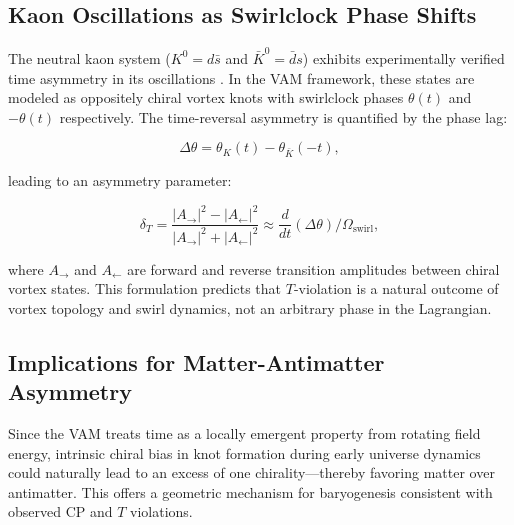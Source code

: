 \subsection{Kaon Oscillations as Swirlclock Phase Shifts}

The neutral kaon system ($K^0 = d\bar{s}$ and $\bar{K}^0 = \bar{d}s$) exhibits experimentally verified time asymmetry in its oscillations \cite{christenson1964evidence, cplear1998tviolation}. In the VAM framework, these states are modeled as oppositely chiral vortex knots with swirlclock phases $\theta(t)$ and $-\theta(t)$ respectively. The time-reversal asymmetry is quantified by the phase lag:

\begin{equation}
\Delta \theta = \theta_K(t) - \theta_{\bar{K}}(-t),
\end{equation}

leading to an asymmetry parameter:

\begin{equation}
\delta_T = \frac{|A_{\rightarrow}|^2 - |A_{\leftarrow}|^2}{|A_{\rightarrow}|^2 + |A_{\leftarrow}|^2} \approx \frac{d}{dt} (\Delta \theta) \Big/ \Omega_{\text{swirl}},
\end{equation}

where $A_{\rightarrow}$ and $A_{\leftarrow}$ are forward and reverse transition amplitudes between chiral vortex states. This formulation predicts that $T$-violation is a natural outcome of vortex topology and swirl dynamics, not an arbitrary phase in the Lagrangian.

\subsection{Implications for Matter-Antimatter Asymmetry}

Since the VAM treats time as a locally emergent property from rotating field energy, intrinsic chiral bias in knot formation during early universe dynamics could naturally lead to an excess of one chirality—thereby favoring matter over antimatter. This offers a geometric mechanism for baryogenesis consistent with observed CP and $T$ violations.

